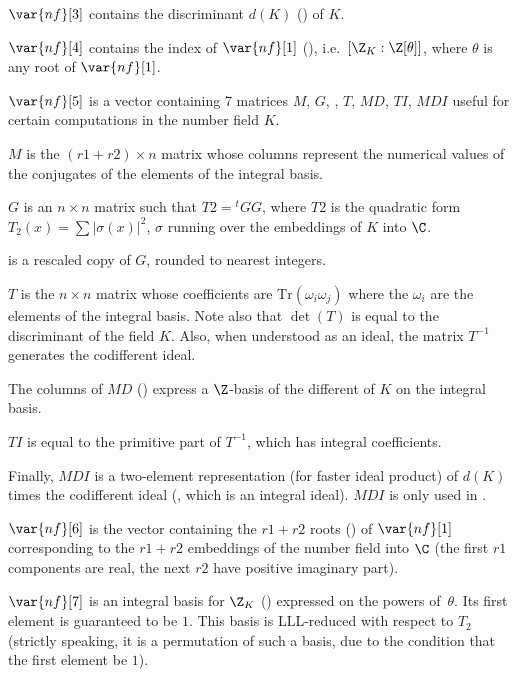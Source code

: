 $\var{nf}[3]$ contains the discriminant $d(K)$ () of $K$.

$\var{nf}[4]$ contains the index of $\var{nf}[1]$ (),
i.e.~$[\Z_K : \Z[\theta]]$, where $\theta$ is any root of $\var{nf}[1]$.

$\var{nf}[5]$ is a vector containing 7 matrices $M$, $G$, , $T$,
$MD$, $TI$, $MDI$ useful for certain computations in the number field $K$.

\quad\item $M$ is the $(r1+r2)\times n$ matrix whose columns represent
the numerical values of the conjugates of the elements of the integral
basis.

\quad\item $G$ is an $n\times n$ matrix such that $T2 = {}^t G G$,
where $T2$ is the quadratic form $T_2(x) = \sum |\sigma(x)|^2$, $\sigma$
running over the embeddings of $K$ into $\C$.

\quad\item {} is a rescaled copy of $G$, rounded to nearest
integers.

\quad\item $T$ is the $n\times n$ matrix whose coefficients are
$\text{Tr}(\omega_i\omega_j)$ where the $\omega_i$ are the elements of the
integral basis. Note also that $\det(T)$ is equal to the discriminant of the
field $K$. Also, when understood as an ideal, the matrix $T^{-1}$
generates the codifferent ideal.

\quad\item The columns of $MD$ () express a $\Z$-basis
of the different of $K$ on the integral basis.

\quad\item $TI$ is equal to the primitive part of $T^{-1}$, which has integral
coefficients.

\quad\item Finally, $MDI$ is a two-element representation (for faster
ideal product) of $d(K)$ times the codifferent ideal
(, which is an integral ideal). $MDI$
is only used in .

$\var{nf}[6]$ is the vector containing the $r1+r2$ roots
() of $\var{nf}[1]$ corresponding to the $r1+r2$
embeddings of the number field into $\C$ (the first $r1$ components are real,
the next $r2$ have positive imaginary part).

$\var{nf}[7]$ is an integral basis for $\Z_K$ () expressed
on the powers of~$\theta$. Its first element is guaranteed to be $1$. This
basis is LLL-reduced with respect to $T_2$ (strictly speaking, it is a
permutation of such a basis, due to the condition that the first element be
$1$).

